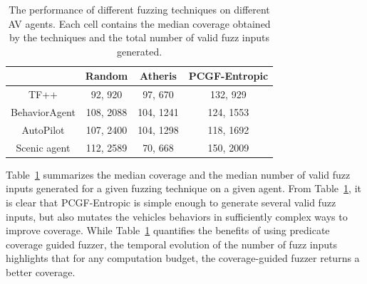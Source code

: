 \begin{table}[]
    \centering
\begin{tabular}{|c|c|c|c|}
\hline
 & Random & Atheris & PCGF-Entropic\\
\hline
TF++ & 92, 920 & 97, 670 & 132, 929 \\
BehaviorAgent & 108, 2088 & 104, 1241 & 124, 1553 \\
AutoPilot & 107, 2400 & 104, 1298 & 118, 1692 \\
Scenic agent & 112, 2589 & 70, 668 & 150, 2009 \\
\hline
\end{tabular}
    \caption{The performance of different fuzzing techniques on different AV agents. Each cell contains the median coverage obtained by the techniques and the total number of valid fuzz inputs generated.}
    \label{tab:all-medians}
\end{table}

Table~\ref{tab:all-medians} summarizes the median coverage and the median number of valid fuzz inputs generated for a given fuzzing technique on a given agent.
% 
% 
From Table~\ref{tab:all-medians}, it is clear that PCGF-Entropic is simple enough to generate several valid fuzz inputs, but also mutates the vehicles behaviors in sufficiently complex ways to improve coverage.
% 
While Table~\ref{tab:all-medians} quantifies the benefits of using predicate coverage guided fuzzer, the temporal evolution of the number of fuzz inputs highlights that for any computation budget, the coverage-guided fuzzer returns a better coverage.
 

